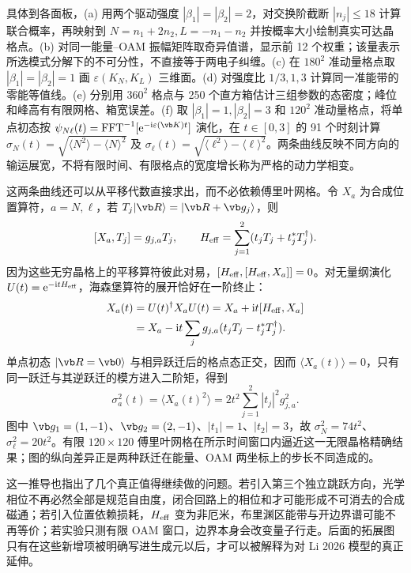 具体到各面板，(a) 用两个驱动强度 $|\beta_1|=|\beta_2|=2$，对交换阶截断 $|n_j|\le18$ 计算联合概率，再映射到 $N=n_1+2n_2,L=-n_1-n_2$ 并按概率大小绘制真实可达晶格点。(b) 对同一能量--OAM 振幅矩阵取奇异值谱，显示前 12 个权重；该量表示所选模式分解下的不可分性，不直接等于两电子纠缠。(c) 在 $180^2$ 准动量格点取 $|\beta_1|=|\beta_2|=1$ 画 $\varepsilon(K_N,K_L)$ 三维面。(d) 对强度比 $1/3,1,3$ 计算同一准能带的零能等值线。(e) 分别用 $360^2$ 格点与 250 个直方箱估计三组参数的态密度；峰位和峰高有有限网格、箱宽误差。(f) 取 $|\beta_1|=1,|\beta_2|=3$ 和 $120^2$ 准动量格点，将单点初态按 $\psi_{N\ell}(t)=\operatorname{FFT}^{-1}[\ee^{-\ii\varepsilon(\vb K)t}]$ 演化，在 $t\in[0,3]$ 的 91 个时刻计算 $\sigma_N(t)=\sqrt{\langle N^2\rangle-\langle N\rangle^2}$ 及 $\sigma_\ell(t)=\sqrt{\langle\ell^2\rangle-\langle\ell\rangle^2}$。两条曲线反映不同方向的输运展宽，不将有限时间、有限格点的宽度增长称为严格的动力学相变。

这两条曲线还可以从平移代数直接求出，而不必依赖傅里叶网格。令 $X_a$ 为合成位置算符，$a=N,\ell$，若 $T_j|\vb R\rangle=|\vb R+\vb g_j\rangle$，则
\[
 [X_a,T_j]=g_{j,a}T_j,\qquad H_{\rm eff}=\sum_{j=1}^2(t_jT_j+t_j^*T_j^\dagger).
\]
因为这些无穷晶格上的平移算符彼此对易，$[H_{\rm eff},[H_{\rm eff},X_a]]=0$。对无量纲演化 $U(t)=\mathrm{e}^{-\mathrm{i} t H_{\rm eff}}$，海森堡算符的展开恰好在一阶终止：
\begin{align*}
 X_a(t)&=U(t)^\dagger X_aU(t)
 =X_a+\mathrm{i} t[H_{\rm eff},X_a]\\
 &=X_a-\mathrm{i} t\sum_j g_{j,a}(t_jT_j-t_j^*T_j^\dagger).
\end{align*}
单点初态 $|\vb R=\vb0\rangle$ 与相异跃迁后的格点态正交，因而 $\langle X_a(t)\rangle=0$，只有同一跃迁与其逆跃迁的模方进入二阶矩，得到
\begin{equation}
 \sigma_a^2(t)=\langle X_a(t)^2\rangle=2t^2\sum_{j=1}^2|t_j|^2g_{j,a}^2.
 \label{eq:li-ballistic-width}
\end{equation}
图中 $\vb g_1=(1,-1)$、$\vb g_2=(2,-1)$、$|t_1|=1$、$|t_2|=3$，故 $\sigma_N^2=74t^2$、$\sigma_\ell^2=20t^2$。有限 $120\times120$ 傅里叶网格在所示时间窗口内逼近这一无限晶格精确结果；图的纵向差异正是两种跃迁在能量、OAM 两坐标上的步长不同造成的。


这一推导也指出了几个真正值得继续做的问题。若引入第三个独立跳跃方向，光学相位不再必然全部是规范自由度，闭合回路上的相位和才可能形成不可消去的合成磁通；若引入位置依赖损耗，$H_{\rm eff}$ 变为非厄米，布里渊区能带与开边界谱可能不再等价；若实验只测有限 OAM 窗口，边界本身会改变量子行走。后面的拓展图只有在这些新增项被明确写进生成元以后，才可以被解释为对 Li 2026 模型的真正延伸。


